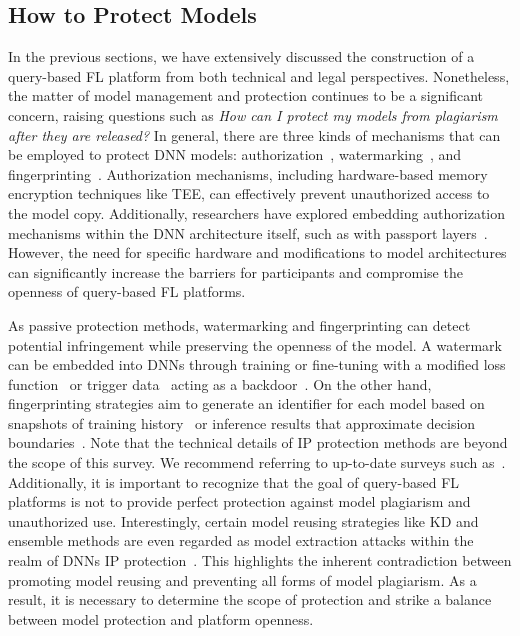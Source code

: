 \subsection{How to Protect Models}
\label{sec:how2protect}
In the previous sections, we have extensively discussed the construction of a query-based FL platform from both technical and legal perspectives. 
Nonetheless, the matter of model management and protection continues to be a significant concern, raising questions such as \textit{How can I protect my models from plagiarism after they are released?}
In general, there are three kinds of mechanisms that can be employed to protect DNN models: authorization~\cite{hanzlik2021mlcapsule}, watermarking~\cite{tekgul2021waffle}, and fingerprinting~\cite{li2023fedipr}.
Authorization mechanisms, including hardware-based memory encryption techniques like TEE, can effectively prevent unauthorized access to the model copy.
Additionally, researchers have explored embedding authorization mechanisms within the DNN architecture itself, such as with passport layers~\cite{fan2019rethinking, zhang2020passport}.
However, the need for specific hardware and modifications to model architectures can significantly increase the barriers for participants and compromise the openness of query-based FL platforms.

As passive protection methods, watermarking and fingerprinting can detect potential infringement while preserving the openness of the model. 
A watermark can be embedded into DNNs through training or fine-tuning with a modified loss function~\cite{uchida2017embedding} or trigger data~\cite{darvish2019deepsigns} acting as a backdoor~\cite{bagdasaryan2020backdoor}.
On the other hand, fingerprinting strategies aim to generate an identifier for each model based on snapshots of training history~\cite{jia2021proof} or inference results that approximate decision boundaries~\cite{chen2022copy}.
Note that the technical details of IP protection methods are beyond the scope of this survey.
We recommend referring to up-to-date surveys such as~\cite{peng2022intellectual, sun2023deep}.
Additionally, it is important to recognize that the goal of query-based FL platforms is not to provide perfect protection against model plagiarism and unauthorized use.
Interestingly, certain model reusing strategies like KD and ensemble methods are even regarded as model extraction attacks within the realm of DNNs IP protection~\cite{charette2022cosine}.
This highlights the inherent contradiction between promoting model reusing and preventing all forms of model plagiarism.
As a result, it is necessary to determine the scope of protection and strike a balance between model protection and platform openness.

